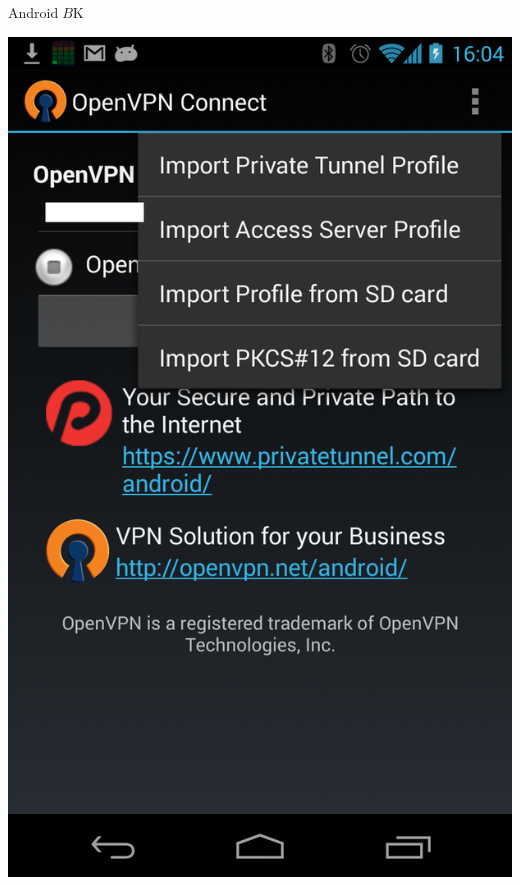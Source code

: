 {{{\begin{frame}{Android$B$K%

\includegraphics[height=0.9\vsize,bb=0 0 768 1280]{image201308/Screenshot_2013-08-17-16-04-31.png}

}
\end{frame}}}}
